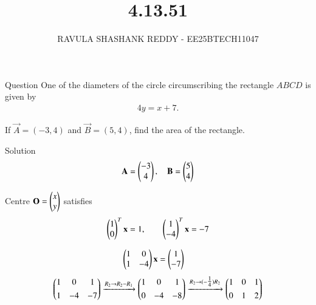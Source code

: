 \documentclass{beamer}
\title %
{4.13.51}
\author %
{RAVULA SHASHANK REDDY - EE25BTECH11047}
\begin{document}
	
	
	\frame{\titlepage}
	\begin{frame}{Question}
One of the diameters of the circle circumscribing the rectangle \(ABCD\) is given by
\begin{align*}
4y = x + 7.
\end{align*}

If \(\vec{A}=(-3,4)\) and \(\vec{B}=(5,4)\), find the area of the rectangle.

\end{frame}
\begin{frame}{Solution}
    \begin{align}
\mathbf{A}=\begin{pmatrix}-3\\4\end{pmatrix},\quad \mathbf{B}=\begin{pmatrix}5\\4\end{pmatrix}
\end{align}

Centre \(\mathbf{O}=\begin{pmatrix}x\\y\end{pmatrix}\) satisfies
\begin{align}
\begin{pmatrix}1 \\ 0\end{pmatrix}^T\mathbf{x}=1,\qquad \begin{pmatrix}1 \\ -4\end{pmatrix}^T\mathbf{x}=-7
\end{align}

\begin{align}
\begin{pmatrix}1 & 0\\ 1 & -4\end{pmatrix}\mathbf{x} &= \begin{pmatrix}1\\-7\end{pmatrix}
\end{align}
\begin{align}
\begin{pmatrix}1 & 0 & 1\\[4pt] 1 & -4 & -7\end{pmatrix}
\xrightarrow{R_2\rightarrow R_2-R_1}
\begin{pmatrix}1 & 0 & 1\\[4pt] 0 & -4 & -8\end{pmatrix}
\xrightarrow{R_2\rightarrow (-\tfrac{1}{4})R_2}
\begin{pmatrix}1 & 0 & 1\\[4pt] 0 & 1 & 2\end{pmatrix}
\end{align}
\end{frame}
\end{document}
